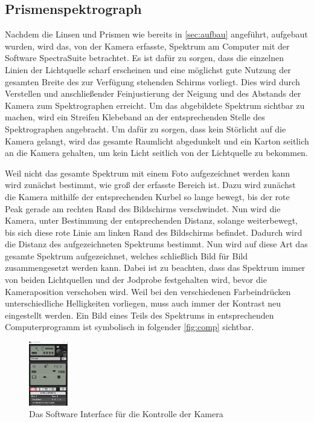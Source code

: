 \documentclass[12pt,english,ngerman]{scrartcl}
\begin{document}
\subsection{Prismenspektrograph}

Nachdem die Linsen und Prismen wie bereits in \autoref{sec:aufbau} angeführt,
aufgebaut wurden, wird das, von der Kamera erfasste, Spektrum am Computer mit
der Software SpectraSuite betrachtet. Es ist dafür zu sorgen, dass die
einzelnen Linien der Lichtquelle scharf erscheinen und eine möglichst gute
Nutzung der gesamten Breite des zur Verfügung stehenden Schirms vorliegt. Dies
wird durch Verstellen und anschließender Feinjustierung der Neigung und des
Abstands der Kamera zum Spektrographen erreicht. Um das abgebildete Spektrum
sichtbar zu machen, wird ein Streifen Klebeband an der entsprechenden Stelle
des Spektrographen angebracht. Um dafür zu sorgen, dass kein Störlicht auf die
Kamera gelangt, wird das gesamte Raumlicht abgedunkelt und ein Karton seitlich
an die Kamera gehalten, um kein Licht seitlich von der Lichtquelle zu bekommen.

Weil nicht das gesamte Spektrum mit einem Foto aufgezeichnet werden kann wird
zunächst bestimmt, wie groß der erfasste Bereich ist. Dazu wird zunächst die
Kamera mithilfe der entsprechenden Kurbel so lange bewegt, bis der rote Peak
gerade am rechten Rand des Bildschirms verschwindet. Nun wird die Kamera, unter
Bestimmung der entsprechenden Distanz, solange weiterbewegt, bis sich diese
rote Linie am linken Rand des Bildschirms befindet. Dadurch wird die Distanz
des aufgezeichneten Spektrums bestimmt. Nun wird auf diese Art das gesamte
Spektrum aufgezeichnet, welches schließlich Bild für Bild zusammengesetzt
werden kann. Dabei ist zu beachten, dass das Spektrum immer von beiden
Lichtquellen und der Jodprobe festgehalten wird, bevor die Kameraposition
verschoben wird. Weil bei den verschiedenen Farbeindrücken unterschiedliche
Helligkeiten vorliegen, muss auch immer der Kontrast neu eingestellt werden.
Ein Bild eines Teils des Spektrums in entsprechenden Computerprogramm ist
symbolisch in folgender \autoref{fig:comp} sichtbar.

\begin{figure}
	\begin{center}
		\includegraphics[width=0.15\textwidth]{figures/camerasoftware.png}
	\end{center}
	\caption{Das Software Interface für die Kontrolle der Kamera
	}\label{fig:comp}
\end{figure}
\end{document}
